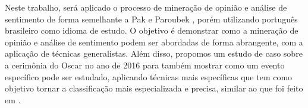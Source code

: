 Neste trabalho, será aplicado o processo de mineração de opinião e análise de sentimento de forma semelhante a Pak e Paroubek \cite{pak2010twitter}, porém utilizando português brasileiro como idioma de estudo. O objetivo é demonstrar como a mineração de opinião e análise de sentimento podem ser abordadas de forma abrangente, com a aplicação de técnicas generalistas. Além disso, propomos um estudo de caso sobre a cerimônia do Oscar no ano de 2016 para também mostrar como um evento específico pode ser estudado, aplicando técnicas mais específicas que tem como objetivo tornar a classificação mais especializada e precisa, similar ao que foi feito em \cite{rodrigues2012characterizing} \cite{franca2014analise} \cite{carvalho2014mineraccao} .